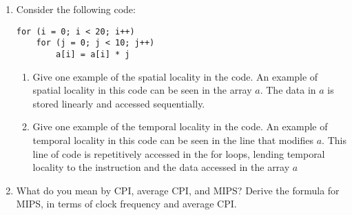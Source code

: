 \documentclass{article}
\begin{document}
\begin{enumerate}
    \pagebreak
    \item Consider the following code:
    \begin{verbatim}
for (i = 0; i < 20; i++)
    for (j = 0; j < 10; j++)
        a[i] = a[i] * j
    \end{verbatim}
    \begin{enumerate}
        \item Give one example of the spatial locality in the code. 
        \newline An example of spatial locality in this code can be seen in the array $a$. 
        The data in $a$ is stored linearly and accessed sequentially.
        \item Give one example of the temporal locality in the code.
        \newline An example of temporal locality in this code can be seen in the line that modifies $a$.
        This line of code is repetitively accessed in the for loops, lending temporal locality to the instruction
        and the data accessed in the array $a$
    \end{enumerate}

    \item What do you mean by CPI, average CPI, and MIPS? Derive the formula for MIPS, in terms
    of clock frequency and average CPI.
    \newline 
    
\end{enumerate}
\end{document}

